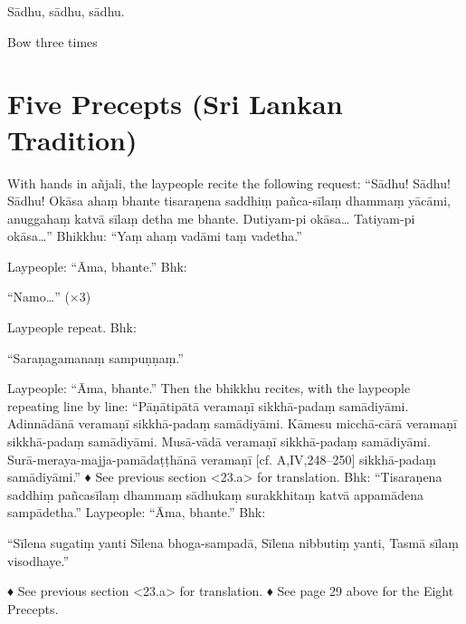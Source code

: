 Sādhu, sādhu, sādhu.

\begin{instruction}
  Bow three times
\end{instruction}

\chapter{Five Precepts (Sri Lankan Tradition)}

With hands in añjali, the laypeople recite the
following request:
“Sādhu! Sādhu! Sādhu!
Okāsa ahaṃ bhante tisaraṇena saddhiṃ
pañca-sīlaṃ dhammaṃ yācāmi, anuggahaṃ
katvā sīlaṃ detha me bhante.
Dutiyam-pi okāsa…
Tatiyam-pi okāsa…”
Bhikkhu: “Yaṃ ahaṃ vadāmi taṃ vadetha.”

Laypeople: “Āma, bhante.”
Bhk:

“Namo…” (×3)

Laypeople repeat.
Bhk:

“Saraṇagamanaṃ sampuṇṇaṃ.”

Laypeople: “Āma, bhante.”
Then the bhikkhu recites, with the laypeople
repeating line by line:
“Pāṇātipātā veramaṇī sikkhā-padaṃ samādiyāmi.
Adinnādānā veramaṇī sikkhā-padaṃ samādiyāmi.
Kāmesu micchā-cārā veramaṇī sikkhā-padaṃ
samādiyāmi.
Musā-vādā veramaṇī sikkhā-padaṃ samādiyāmi.
Surā-meraya-majja-pamādaṭṭhānā veramaṇī
[cf. A,IV,248–250]
sikkhā-padaṃ samādiyāmi.”
♦ See previous section <23.a> for translation.
Bhk: “Tisaraṇena saddhiṃ pañcasīlaṃ
dhammaṃ sādhukaṃ surakkhitaṃ katvā
appamādena sampādetha.”
Laypeople: “Āma, bhante.”
Bhk:

“Sīlena sugatiṃ yanti
Sīlena bhoga-sampadā,
Sīlena nibbutiṃ yanti,
Tasmā sīlaṃ visodhaye.”

♦ See previous section <23.a> for translation.
♦ See page 29 above for the Eight Precepts.

